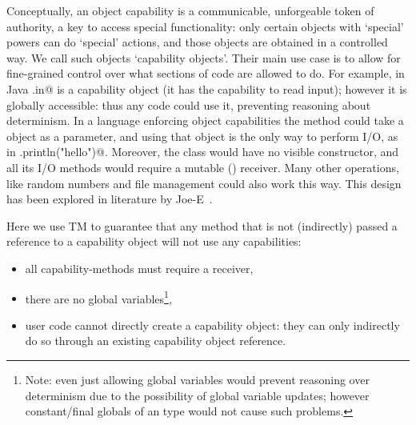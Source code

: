 Conceptually, an object capability is a communicable, unforgeable token of authority, a key to access special functionality: only certain objects with `special' powers can do `special' actions, and those objects are obtained in a controlled way. We call such objects `capability objects'.
Their main use case is to allow for fine-grained control over what sections of code are allowed to do. For example, in Java \Q@System.in@ is a capability object (it has the capability to read input); however it is globally accessible: thus any code could use it, preventing reasoning about determinism.
In a language enforcing object capabilities the \Q@main@ method could take a \Q@System@ object as a parameter, and using that object is the only way to perform I/O, as in \Q@mySystem.println("hello")@.
Moreover, the \Q@System@ class would have no visible constructor, and all its I/O methods would require a mutable (\Q@mut@) receiver.
Many other operations, like random numbers and file management 
could also work this way.
\noindent This design has been explored in literature by Joe-E~\cite{finifter2008verifiable}.

Here we use TM to guarantee that any method that is not (indirectly) passed a \Q@mut@ reference to a capability object will not use any capabilities:
\begin{itemize}
\item all capability-methods must require a \Q@mut@ receiver,
\item there are no global variables\footnote{Note: even just allowing \Q@imm@
global variables would prevent reasoning over determinism due to the possibility of global variable updates; however constant/final globals of an \Q@imm@ type would not cause such problems.},
\item user code cannot directly create a capability object: they can only indirectly do so through an existing \Q@mut@ capability object reference.

\end{itemize}






